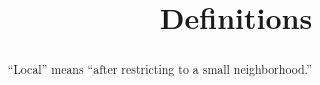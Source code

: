 \documentclass{ximera}
\title{Definitions}
\begin{document}
\begin{abstract}
  ``Local'' means ``after restricting to a small neighborhood.''
\end{abstract}
\end{document}
